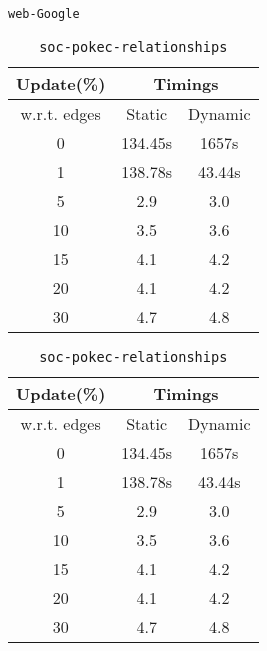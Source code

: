 \begin{table}[H]
{    \centering
    \caption{\texttt{web-Google}}
    \label{tab:web-Google}
    \begin{tabular}{|c|c|c|}
        \hline
        \textbf{Update(\%)} & \multicolumn{2}{c|}{\textbf{Timings}} \\
        \hline
        w.r.t. edges & Static &  Dynamic \\
        \hline
        0 & 134.45s & 1657s \\
        1 & 138.78s & 43.44s \\
        5 & 2.9 & 3.0 \\
        10 & 3.5 & 3.6 \\
        15 & 4.1 & 4.2 \\
        20 & 4.1 & 4.2 \\
        30 & 4.7 & 4.8 \\
        \hline
    \end{tabular}
}
\hfill
\parbox{0.45\linewidth}{
    \vspace{1.5em}
    \centering
    \caption{\texttt{soc-pokec-relationships}}
    \label{tab:soc-pokec-relationships}
    \begin{tabular}{|c|c|c|}
        \hline
        \textbf{Update(\%)} & \multicolumn{2}{c|}{\textbf{Timings}} \\
        \hline
        w.r.t. edges & Static &  Dynamic \\
        \hline
        0 & 134.45s & 1657s \\
        1 & 138.78s & 43.44s \\
        5 & 2.9 & 3.0 \\
        10 & 3.5 & 3.6 \\
        15 & 4.1 & 4.2 \\
        20 & 4.1 & 4.2 \\
        30 & 4.7 & 4.8 \\
        \hline
    \end{tabular}
}
\hfill
\end{table}



